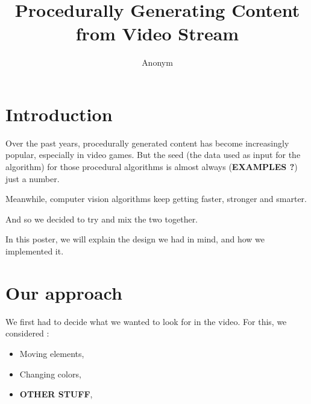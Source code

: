 \documentclass[conference]{acmsiggraph}
\title{Procedurally Generating Content from Video Stream}
\author{Anonym}
\begin{document}


\maketitle


\copyrightspace

\section{Introduction}

Over the past years, procedurally generated content has become increasingly popular, especially in video games.
But the seed (the data used as input for the algorithm) for those procedural algorithms is almost always (\textbf{EXAMPLES ?}) just a number.

Meanwhile, computer vision algorithms keep getting faster, stronger and smarter.

And so we decided to try and mix the two together.

In this poster, we will explain the design we had in mind, and how we implemented it.

\section{Our approach}

We first had to decide what we wanted to look for in the video.
For this, we considered : 
\begin{itemize}
	\item Moving elements,
	\item Changing colors,
	\item \textbf{OTHER STUFF},
\end{itemize}
\end{document}
